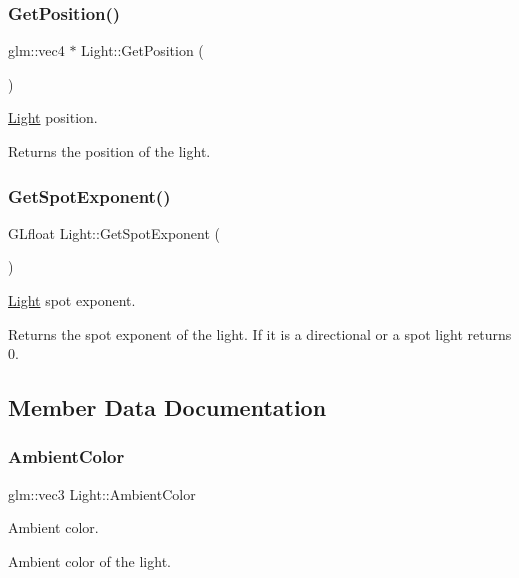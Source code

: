 \subsubsection{\texorpdfstring{Get\+Position()}{GetPosition()}}
{\footnotesize\ttfamily glm\+::vec4 $\ast$ Light\+::\+Get\+Position (\begin{DoxyParamCaption}{ }\end{DoxyParamCaption})}



\hyperlink{class_light}{Light} position. 

Returns the position of the light. \mbox{\label{class_light_ad40e4b5500b2b8d9be2ec76dc99e8868}} 
\subsubsection{\texorpdfstring{Get\+Spot\+Exponent()}{GetSpotExponent()}}
{\footnotesize\ttfamily G\+Lfloat Light\+::\+Get\+Spot\+Exponent (\begin{DoxyParamCaption}{ }\end{DoxyParamCaption})}



\hyperlink{class_light}{Light} spot exponent. 

Returns the spot exponent of the light. If it is a directional or a spot light returns 0. 

\subsection{Member Data Documentation}
\mbox{\label{class_light_a3ddf6a283f42e3e3ce6a403b9477f7c2}} 
\subsubsection{\texorpdfstring{Ambient\+Color}{AmbientColor}}
{\footnotesize\ttfamily glm\+::vec3 Light\+::\+Ambient\+Color}



Ambient color. 

Ambient color of the light. \mbox{\label{class_light_ab3885005f09ec9411cc1f31c069dc7d9}} 

